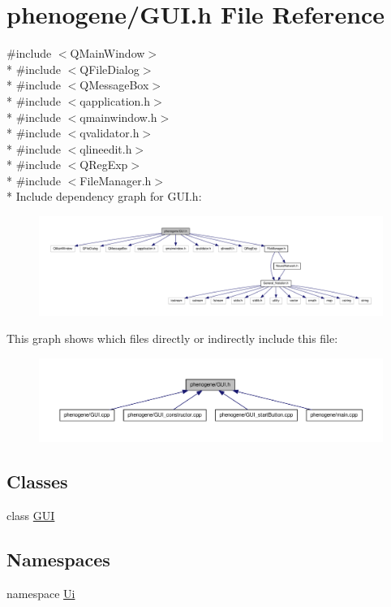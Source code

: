 \hypertarget{a00010}{\section{phenogene/\-G\-U\-I.h File Reference}
\label{d7/dec/a00010}
}
{\ttfamily \#include $<$Q\-Main\-Window$>$}\\*
{\ttfamily \#include $<$Q\-File\-Dialog$>$}\\*
{\ttfamily \#include $<$Q\-Message\-Box$>$}\\*
{\ttfamily \#include $<$qapplication.\-h$>$}\\*
{\ttfamily \#include $<$qmainwindow.\-h$>$}\\*
{\ttfamily \#include $<$qvalidator.\-h$>$}\\*
{\ttfamily \#include $<$qlineedit.\-h$>$}\\*
{\ttfamily \#include $<$Q\-Reg\-Exp$>$}\\*
{\ttfamily \#include $<$File\-Manager.\-h$>$}\\*
Include dependency graph for G\-U\-I.\-h\-:\nopagebreak
\begin{figure}[H]
\begin{center}
\leavevmode
\includegraphics[width=350pt]{d5/d79/a00030}
\end{center}
\end{figure}
This graph shows which files directly or indirectly include this file\-:\nopagebreak
\begin{figure}[H]
\begin{center}
\leavevmode
\includegraphics[width=350pt]{df/d61/a00031}
\end{center}
\end{figure}
\subsection*{Classes}
\begin{DoxyCompactItemize}
\item 
class \hyperlink{a00002}{G\-U\-I}
\end{DoxyCompactItemize}
\subsection*{Namespaces}
\begin{DoxyCompactItemize}
\item 
namespace \hyperlink{a00020}{Ui}
\end{DoxyCompactItemize}
